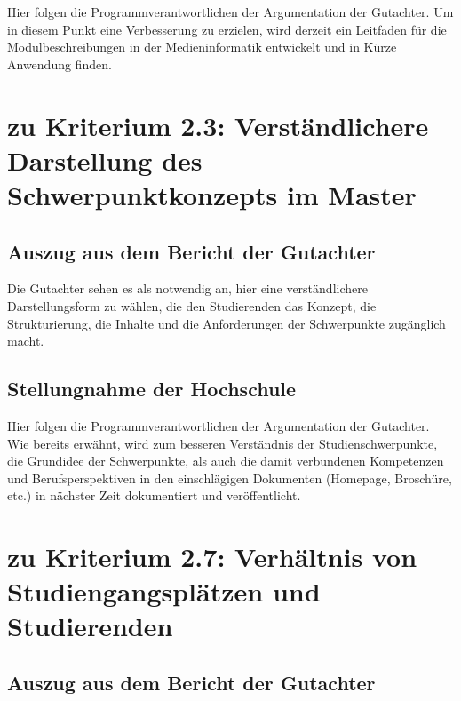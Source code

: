 Hier folgen die Programmverantwortlichen der Argumentation der
Gutachter. Um in diesem Punkt eine Verbesserung zu erzielen, wird
derzeit ein Leitfaden für die Modulbeschreibungen in der
Medieninformatik entwickelt und in Kürze Anwendung finden.

\section{zu Kriterium 2.3: Verständlichere Darstellung des
Schwerpunktkonzepts im
Master}\label{zu-kriterium-2.3-verstuxe4ndlichere-darstellung-des-schwerpunktkonzepts-im-master}

\subsection{Auszug aus dem Bericht der
Gutachter}\label{auszug-aus-dem-bericht-der-gutachter-4}

\begin{siderules}
Die Gutachter sehen es als notwendig an, hier eine verständlichere
Darstellungsform zu wählen, die den Studierenden das Konzept, die
Strukturierung, die Inhalte und die Anforderungen der Schwerpunkte
zugänglich macht.
\end{siderules}

\subsection{Stellungnahme der
Hochschule}\label{stellungnahme-der-hochschule-3}

Hier folgen die Programmverantwortlichen der Argumentation der
Gutachter. Wie bereits erwähnt, wird zum besseren Verständnis der
Studienschwerpunkte, die Grundidee der Schwerpunkte, als auch die damit
verbundenen Kompetenzen und Berufsperspektiven in den einschlägigen
Dokumenten (Homepage, Broschüre, etc.) in nächster Zeit dokumentiert und
veröffentlicht.

\section{zu Kriterium 2.7: Verhältnis von Studiengangsplätzen und
Studierenden}\label{zu-kriterium-2.7-verhuxe4ltnis-von-studiengangspluxe4tzen-und-studierenden}

\subsection{Auszug aus dem Bericht der
Gutachter}\label{auszug-aus-dem-bericht-der-gutachter-5}

